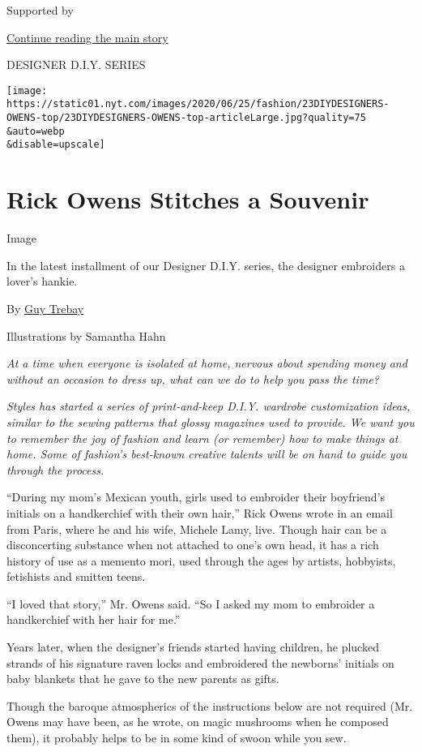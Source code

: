 Supported by

\protect\hyperlink{after-sponsor}{Continue reading the main story}

DESIGNER D.I.Y. SERIES

\texttt{[image: https://static01.nyt.com/images/2020/06/25/fashion/23DIYDESIGNERS-OWENS-top/23DIYDESIGNERS-OWENS-top-articleLarge.jpg?quality=75\\\&auto=webp\\\&disable=upscale]}

\hypertarget{rick-owens-stitches-a-souvenir}{%
\section{Rick Owens Stitches a
Souvenir}\label{rick-owens-stitches-a-souvenir}}

Image

In the latest installment of our Designer D.I.Y. series, the designer
embroiders a lover's hankie.

By \href{https://www.nytimes.com/by/guy-trebay}{Guy Trebay}

Illustrations by Samantha Hahn

\emph{At a time when everyone is isolated at home, nervous about
spending money and without an occasion to dress up, what can we do to
help you pass the time?}

\emph{Styles has started a series of print-and-keep D.I.Y. wardrobe
customization ideas, similar to the sewing patterns that glossy
magazines used to provide. We want you to remember the joy of fashion
and learn (or remember) how to make things at home. Some of fashion's
best-known creative talents will be on hand to guide you through the
process.}

``During my mom's Mexican youth, girls used to embroider their
boyfriend's initials on a handkerchief with their own hair,'' Rick Owens
wrote in an email from Paris, where he and his wife, Michele Lamy, live.
Though hair can be a disconcerting substance when not attached to one's
own head, it has a rich history of use as a memento mori, used through
the ages by artists, hobbyists, fetishists and smitten teens.

``I loved that story,'' Mr. Owens said. ``So I asked my mom to embroider
a handkerchief with her hair for me.''

Years later, when the designer's friends started having children, he
plucked strands of his signature raven locks and embroidered the
newborns' initials on baby blankets that he gave to the new parents as
gifts.

Though the baroque atmospherics of the instructions below are not
required (Mr. Owens may have been, as he wrote, on magic mushrooms when
he composed them), it probably helps to be in some kind of swoon while
you sew.

